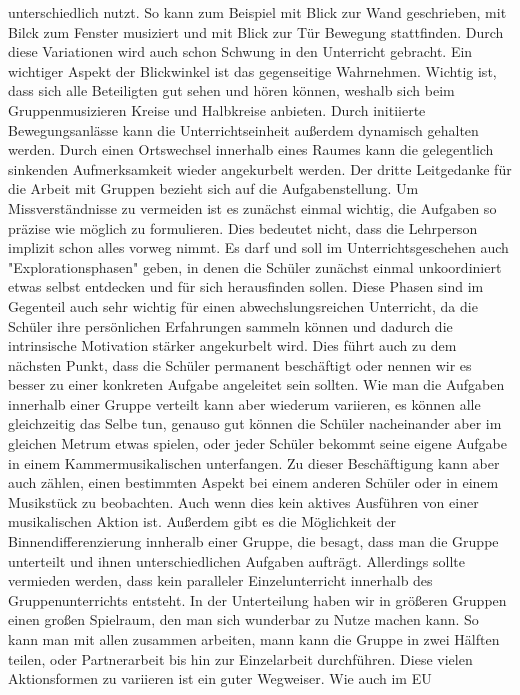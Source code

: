 unterschiedlich nutzt. So kann zum Beispiel mit Blick zur Wand geschrieben, mit Bilck zum
Fenster musiziert und mit Blick zur Tür Bewegung stattfinden. Durch diese
Variationen wird auch schon Schwung in den Unterricht gebracht. Ein wichtiger
Aspekt der Blickwinkel ist das gegenseitige Wahrnehmen. Wichtig ist, dass sich
alle Beteiligten gut sehen und hören können, weshalb sich beim Gruppenmusizieren
Kreise und Halbkreise anbieten. Durch initiierte Bewegungsanlässe kann die
Unterrichtseinheit außerdem dynamisch gehalten werden. Durch einen Ortswechsel
innerhalb eines Raumes kann die gelegentlich sinkenden Aufmerksamkeit wieder
angekurbelt werden. 
Der dritte Leitgedanke für die Arbeit mit Gruppen bezieht sich auf die
Aufgabenstellung. Um Missverständnisse zu vermeiden ist es zunächst einmal
wichtig, die Aufgaben so präzise wie möglich zu formulieren. Dies bedeutet
nicht, dass die Lehrperson implizit schon alles vorweg nimmt. Es darf und soll
im Unterrichtsgeschehen auch "Explorationsphasen" geben, in denen die Schüler
zunächst einmal unkoordiniert etwas selbst entdecken und für sich herausfinden
sollen. Diese Phasen sind im Gegenteil auch sehr wichtig für einen
abwechslungsreichen Unterricht, da die Schüler ihre persönlichen Erfahrungen
sammeln können und dadurch die intrinsische Motivation stärker angekurbelt wird.
Dies führt auch zu dem nächsten Punkt, dass die Schüler permanent beschäftigt
oder nennen wir es besser zu einer konkreten Aufgabe angeleitet
sein sollten. Wie man die Aufgaben innerhalb einer Gruppe verteilt kann aber
wiederum variieren, es können alle gleichzeitig das Selbe tun, genauso gut
können die Schüler nacheinander aber im gleichen Metrum etwas spielen, oder
jeder Schüler bekommt seine eigene Aufgabe in einem Kammermusikalischen
unterfangen. Zu dieser Beschäftigung kann aber auch zählen, einen bestimmten
Aspekt bei einem anderen Schüler oder in einem Musikstück zu beobachten. Auch
wenn dies kein aktives Ausführen von einer musikalischen Aktion ist. Außerdem
gibt es die Möglichkeit der Binnendifferenzierung innheralb einer Gruppe, die
besagt, dass man die Gruppe unterteilt und ihnen unterschiedlichen Aufgaben
aufträgt. Allerdings sollte vermieden werden, dass kein paralleler
Einzelunterricht innerhalb des Gruppenunterrichts entsteht. In der Unterteilung
haben wir in größeren Gruppen einen großen Spielraum, den man sich wunderbar zu
Nutze machen kann. So kann man mit allen zusammen arbeiten, mann kann die Gruppe
in zwei Hälften teilen, oder Partnerarbeit bis hin zur Einzelarbeit durchführen.
Diese vielen Aktionsformen zu variieren ist ein guter Wegweiser. Wie auch im EU
